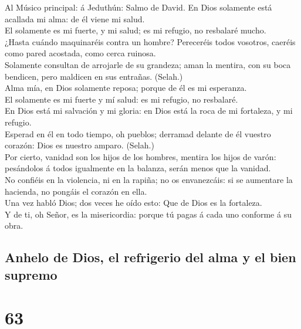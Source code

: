  Al Músico principal: á Jeduthún: Salmo de David. En Dios
solamente está acallada mi alma: de él viene mi salud.\\
 El solamente es mi fuerte, y mi salud; es mi refugio, no
resbalaré mucho.\\
 ¿Hasta cuándo maquinaréis contra un hombre? Pereceréis
todos vosotros, caeréis como pared acostada, como cerca ruinosa.\\
 Solamente consultan de arrojarle de su grandeza; aman la
mentira, con su boca bendicen, pero maldicen en sus entrañas. (Selah.)\\
 Alma mía, en Dios solamente reposa; porque de él es mi
esperanza.\\
 El solamente es mi fuerte y mí salud: es mi refugio, no
resbalaré.\\
 En Dios está mi salvación y mi gloria: en Dios está la
roca de mi fortaleza, y mi refugio.\\
 Esperad en él en todo tiempo, oh pueblos; derramad
delante de él vuestro corazón: Dios es nuestro amparo. (Selah.)\\
 Por cierto, vanidad son los hijos de los hombres, mentira
los hijos de varón: pesándolos á todos igualmente en la balanza, serán
menos que la vanidad.\\
 No confiéis en la violencia, ni en la rapiña; no os
envanezcáis: si se aumentare la hacienda, no pongáis el corazón en
ella.\\
 Una vez habló Dios; dos veces he oído esto: Que de Dios
es la fortaleza.\\
 Y de ti, oh Señor, es la misericordia: porque tú pagas á
cada uno conforme á su obra.

\hypertarget{anhelo-de-dios-el-refrigerio-del-alma-y-el-bien-supremo}{%
\subsection{Anhelo de Dios, el refrigerio del alma y el bien
supremo}\label{anhelo-de-dios-el-refrigerio-del-alma-y-el-bien-supremo}}

\hypertarget{section-62}{%
\section{63}\label{section-62}}

